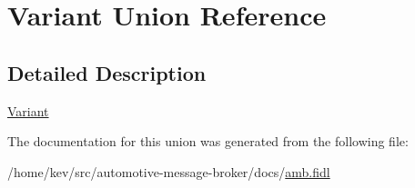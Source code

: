 \hypertarget{unionVariant}{\section{Variant Union Reference}
\label{unionVariant}
}


\subsection{Detailed Description}
\hyperlink{unionVariant}{Variant} 

The documentation for this union was generated from the following file\+:\begin{DoxyCompactItemize}
\item 
/home/kev/src/automotive-\/message-\/broker/docs/\hyperlink{amb_8fidl}{amb.\+fidl}\end{DoxyCompactItemize}
